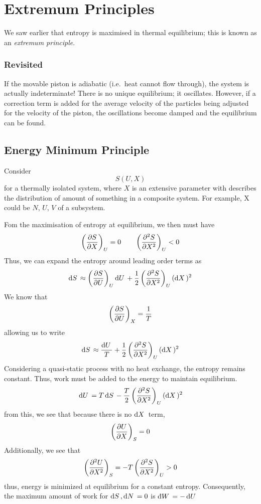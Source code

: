 \chapter{Extremum Principles}
We saw earlier that entropy is maximised in thermal equilibrium; this is known as an \emph{extremum principle}.

\subsection{Revisited}
If the movable piston is adiabatic (i.e.\ heat cannot flow through), the system is actually indeterminate! There is no unique equilibrium; it oscillates. However, if a correction term is added for the average velocity of the particles being adjusted for the velocity of the piston, the oscillations become damped and the equilibrium can be found.

\section{Energy Minimum Principle}
Consider
\[S(U,X)\]
for a thermally isolated system, where \(X\) is an extensive parameter with describes the distribution of amount of something in a composite system. For example, X could be \(N\), \(U\), \(V\) of a subsystem.

Fom the maximisation of entropy at equilibrium, we then must have
\[\left(\frac{\partial S}{\partial X}\right)_U=0 \qquad \left(\frac{\partial ^2S}{\partial X^2}\right)_U<0\]
Thus, we can expand the entropy around leading order terms as
\begin{equation*}
	\d{S}\approx \left(\pder{S}{U}\right)_U\d{U}+\frac{1}{2}\left(\pder{^2S}{X^2}\right)_U(\d{X})^2
\end{equation*}
We know that
\[\left(\frac{\partial S}{\partial U}\right)_X=\frac{1}{T}\]
allowing us to write
\begin{equation}
	\d{S}\approx \frac{\d{U}}{T}+\frac{1}{2}\left(\pder{^2S}{X^2}\right)_U(\d{X})^2
\end{equation}
Considering a quasi-static process with no heat exchange, the entropy remains constant. Thus, work must be added to the energy to maintain equilibrium.
\begin{equation}
	\d{U}=T\d{S}-\frac{T}{2}\left(\pder{^2S}{X^2}\right)_U(\d{X})^2
\end{equation}
from this, we see that because there is no \(\d{X}\) term,
\[\left(\frac{\partial U}{\partial X}\right)_S=0\]
Additionally, we see that
\[\left(\frac{\partial ^2U}{\partial X^2}\right)_S=-T\left(\frac{\partial ^2S}{\partial X^2}\right)_U>0\]
thus, energy is minimized at equilibrium for a constant entropy.
Consequently, the maximum amount of work for \(\d{S},\d{N}=0\) is \(\dbar{W}=-\d{U}\)

